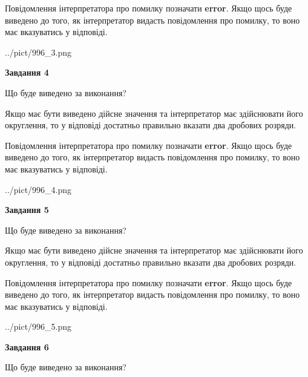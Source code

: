 \documentclass[12pt, ukrainian]{article}
\begin{document}
{\begin {Large}
Повідомлення інтерпретатора про помилку позначати \textbf{error}.
Якщо щось буде виведено до того, як інтерпретатор видасть повідомлення про помилку, 
то воно має вказуватись у відповіді. \par

\begin{center}
	{../pict/996_3.png}
\end{center}
\newpage

{\begin {center}\textbf{Завдання 4}\end {center}}\par
Що буде виведено за виконання? \par

Якщо має бути виведено дійсне значення та інтерпретатор має здійснювати його округлення, 
то у відповіді достатньо правильно вказати два дробових розряди.

Повідомлення інтерпретатора про помилку позначати \textbf{error}.
Якщо щось буде виведено до того, як інтерпретатор видасть повідомлення про помилку, 
то воно має вказуватись у відповіді. \par

\begin{center}
	{../pict/996_4.png}
\end{center}
\newpage

{\begin {center}\textbf{Завдання 5}\end {center}}\par
Що буде виведено за виконання? \par

Якщо має бути виведено дійсне значення та інтерпретатор має здійснювати його округлення, 
то у відповіді достатньо правильно вказати два дробових розряди.

Повідомлення інтерпретатора про помилку позначати \textbf{error}.
Якщо щось буде виведено до того, як інтерпретатор видасть повідомлення про помилку, 
то воно має вказуватись у відповіді. \par

\begin{center}
	{../pict/996_5.png}
\end{center}
\newpage

{\begin {center}\textbf{Завдання 6}\end {center}}\par
Що буде виведено за виконання? \par


\end{Large}}
\end{document}
